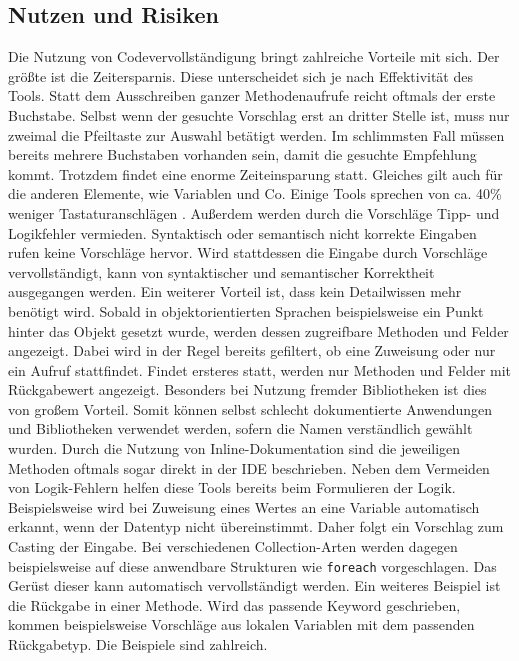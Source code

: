 \subsection{Nutzen und Risiken}
\label{subsec:completion_risks}
Die Nutzung von Codevervollständigung bringt zahlreiche Vorteile mit sich. Der größte ist die Zeitersparnis. Diese unterscheidet sich je nach Effektivität des Tools. Statt dem Ausschreiben ganzer Methodenaufrufe reicht oftmals der erste Buchstabe. Selbst wenn der gesuchte Vorschlag erst an dritter Stelle ist, muss nur zweimal die Pfeiltaste zur Auswahl betätigt werden. Im schlimmsten Fall müssen bereits mehrere Buchstaben vorhanden sein, damit die gesuchte Empfehlung kommt. Trotzdem findet eine enorme Zeiteinsparung statt. Gleiches gilt auch für die anderen Elemente, wie Variablen und Co. Einige Tools sprechen von ca. 40\% weniger Tastaturanschlägen \cite{Kite}. 
Außerdem werden durch die Vorschläge Tipp- und Logikfehler vermieden. Syntaktisch oder semantisch nicht korrekte Eingaben rufen keine Vorschläge hervor. Wird stattdessen die Eingabe durch Vorschläge vervollständigt, kann von syntaktischer und semantischer Korrektheit ausgegangen werden. Ein weiterer Vorteil ist, dass kein Detailwissen mehr benötigt wird. Sobald in objektorientierten Sprachen beispielsweise ein Punkt hinter das Objekt gesetzt wurde, werden dessen zugreifbare Methoden und Felder angezeigt. Dabei wird in der Regel bereits gefiltert, ob eine Zuweisung oder nur ein Aufruf stattfindet. Findet ersteres statt, werden nur Methoden und Felder mit Rückgabewert angezeigt. Besonders bei Nutzung fremder Bibliotheken ist dies von großem Vorteil. Somit können selbst schlecht dokumentierte Anwendungen und Bibliotheken verwendet werden, sofern die Namen verständlich gewählt wurden. Durch die Nutzung von Inline-Dokumentation sind die jeweiligen Methoden oftmals sogar direkt in der IDE beschrieben. 
Neben dem Vermeiden von Logik-Fehlern helfen diese Tools bereits beim Formulieren der Logik. Beispielsweise wird bei Zuweisung eines Wertes an eine Variable automatisch erkannt, wenn der Datentyp nicht übereinstimmt. Daher folgt ein Vorschlag zum Casting der Eingabe. Bei verschiedenen Collection-Arten werden dagegen beispielsweise auf diese anwendbare Strukturen wie \lstinline|foreach| vorgeschlagen. Das Gerüst dieser kann automatisch vervollständigt werden. Ein weiteres Beispiel ist die Rückgabe in einer Methode. Wird das passende Keyword geschrieben, kommen beispielsweise Vorschläge aus lokalen Variablen mit dem passenden Rückgabetyp. Die Beispiele sind zahlreich.

